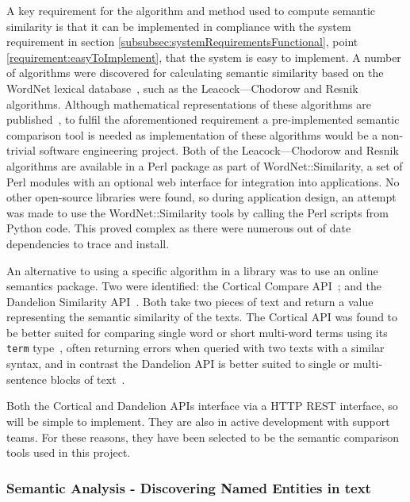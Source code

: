 \documentclass[authoryearcitations]{UoYCSproject}
\begin{document}
A key requirement for the algorithm and method used to compute semantic similarity is that it can be implemented in compliance with the system requirement in section \ref{subsubsec:systemRequirementsFunctional}, point \ref{requirement:easyToImplement}, that the system is easy to implement. A number of algorithms were discovered for calculating semantic similarity based on the WordNet lexical database~\cite{wordNet}, such as the Leacock--–Chodorow and Resnik algorithms. Although mathematical representations of these algorithms are published~\cite{leacock1998combining,resnik1995using}, to fulfil the aforementioned requirement a pre-implemented semantic comparison tool is needed as implementation of these algorithms would be a non-trivial software engineering project. Both of the Leacock--–Chodorow and Resnik algorithms are available in a Perl package as part of WordNet::Similarity, a set of Perl modules with an optional web interface for integration into applications. No other open-source libraries were found, so during application design, an attempt was made to use the WordNet::Similarity tools by calling the Perl scripts from Python code. This proved complex as there were numerous out of date dependencies to trace and install.

An alternative to using a specific algorithm in a library was to use an online semantics package. Two were identified: the Cortical Compare API~\cite{serviceCorticalSim}; and the Dandelion Similarity API~\cite{serviceDandelionSim}. Both take two pieces of text and return a value representing the semantic similarity of the texts. The Cortical API was found to be better suited for comparing single word or short multi-word terms using its \texttt{term} type~\cite{serviceCorticalSim}, often returning errors when queried with two texts with a similar syntax, and in contrast the Dandelion API is better suited to single or multi-sentence blocks of text~\cite{dandelionSim}.

Both the Cortical and Dandelion APIs interface via a HTTP REST interface, so will be simple to implement. They are also in active development with support teams. For these reasons, they have been selected to be the semantic comparison tools used in this project.

\subsubsection{Semantic Analysis - Discovering Named Entities in text}
\label{sec:choosingNamedEntityExtractionApi}
\end{document}
